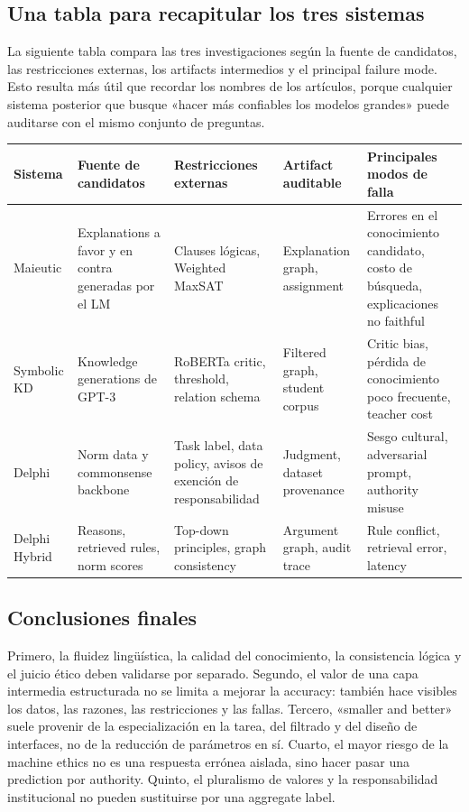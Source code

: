 \documentclass[a4paper]{article}
\begin{document}
\subsection{Una tabla para recapitular los tres sistemas}

La siguiente tabla compara las tres investigaciones según la fuente de candidatos, las restricciones externas, los artifacts intermedios y el principal failure mode. Esto resulta más útil que recordar los nombres de los artículos, porque cualquier sistema posterior que busque «hacer más confiables los modelos grandes» puede auditarse con el mismo conjunto de preguntas.

\begin{longtable}{@{}L{0.13\textwidth}L{0.16\textwidth}L{0.19\textwidth}L{0.18\textwidth}L{0.19\textwidth}@{}}
\toprule
Sistema & Fuente de candidatos & Restricciones externas & Artifact auditable & Principales modos de falla \\
\midrule
Maieutic & Explanations a favor y en contra generadas por el LM & Clauses lógicas, Weighted MaxSAT & Explanation graph, assignment & Errores en el conocimiento candidato, costo de búsqueda, explicaciones no faithful \\
Symbolic KD & Knowledge generations de GPT-3 & RoBERTa critic, threshold, relation schema & Filtered graph, student corpus & Critic bias, pérdida de conocimiento poco frecuente, teacher cost \\
Delphi & Norm data y commonsense backbone & Task label, data policy, avisos de exención de responsabilidad & Judgment, dataset provenance & Sesgo cultural, adversarial prompt, authority misuse \\
Delphi Hybrid & Reasons, retrieved rules, norm scores & Top-down principles, graph consistency & Argument graph, audit trace & Rule conflict, retrieval error, latency \\
\bottomrule
\end{longtable}

\subsection{Conclusiones finales}

Primero, la fluidez lingüística, la calidad del conocimiento, la consistencia lógica y el juicio ético deben validarse por separado. Segundo, el valor de una capa intermedia estructurada no se limita a mejorar la accuracy: también hace visibles los datos, las razones, las restricciones y las fallas. Tercero, «smaller and better» suele provenir de la especialización en la tarea, del filtrado y del diseño de interfaces, no de la reducción de parámetros en sí. Cuarto, el mayor riesgo de la machine ethics no es una respuesta errónea aislada, sino hacer pasar una prediction por authority. Quinto, el pluralismo de valores y la responsabilidad institucional no pueden sustituirse por una aggregate label.
\end{document}
